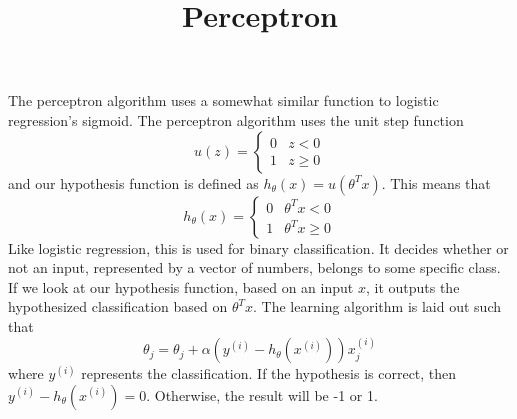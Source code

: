 \documentclass[11pt]{article}
\title{Perceptron}
\author{}
\date{}
\begin{document}
\maketitle
\vspace{-1.2em}
The perceptron algorithm uses a somewhat similar function to logistic regression's sigmoid. The perceptron algorithm uses the unit step function
$$u(z) = \left\{\begin{matrix}
0& z < 0\\ 
1& z \ge 0
\end{matrix}\right.$$
and our hypothesis function is defined as $h_\theta(x) = u\left(\theta^T x\right)$. This means that
$$h_\theta(x) = \left\{\begin{matrix}
0& \theta^T x < 0\\ 
1& \theta^T x \ge 0
\end{matrix}\right.$$
Like logistic regression, this is used for binary classification. It decides whether or not an input, represented by a vector of numbers, belongs to some specific class. If we look at our hypothesis function, based on an input $x$, it outputs the hypothesized classification based on $\theta^T x$. The learning algorithm is laid out such that
$$\theta_j = \theta_j + \alpha \left(y^{(i)}-h_\theta\left(x^{(i)}\right)\right)x_j^{(i)}$$ where $y^{(i)}$ represents the classification. If the hypothesis is correct, then $y^{(i)} - h_\theta\left(x^{(i)}\right) = 0$. Otherwise, the result will be -1 or 1.
\end{document}
